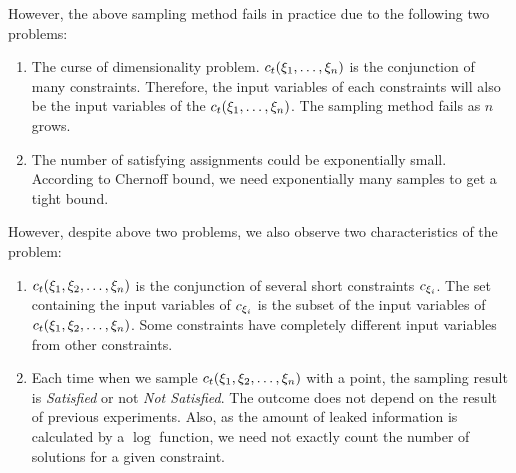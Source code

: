 However, the above sampling method fails in practice due to the following two problems:

\begin{enumerate}
      \item The curse of dimensionality problem. $c_t({{\xi}_{1}},\ldots,{{\xi}_{n}})$ is
            the conjunction of many constraints. Therefore, the input variables
            of each constraints will also be the input variables of the
            $c_t({{\xi}_{1}},\ldots,{{\xi}_{n}})$. The sampling method fails
            as $n$ grows. 


      \item The number of satisfying assignments could be exponentially small.
            According to Chernoff bound, we need exponentially many samples to
            get a tight bound. 
\end{enumerate}

However, despite above two problems, we also observe two characteristics of the
problem:
\begin{enumerate}
      \item $c_t({{\xi}_{1}},{{\xi}_{2}},\ldots,{{\xi}_{n}})$ is the conjunction of
            several short constraints $c_{{\xi}_{i}}$. The set containing the
            input variables of $c_{{\xi}_{i}}$ is the subset of the input
            variables of $c_t({{\xi}_{1}},{{\xi}_{2}},\ldots,{{\xi}_{n}})$. Some
            constraints have completely different input variables from other
            constraints.

            \item Each time when we sample $c_t({{\xi}_{1}},{{\xi}_{2}},\ldots,{{\xi}_{n}})$
            with a point, the sampling result is \emph{Satisfied} or not \emph{Not Satisfied}.
            The outcome does not depend on the result of 
            previous experiments. Also, as the amount of leaked information is calculated
            by a $\log$ function, we need not exactly count the number of solutions for 
            a given constraint.

\end{enumerate}

